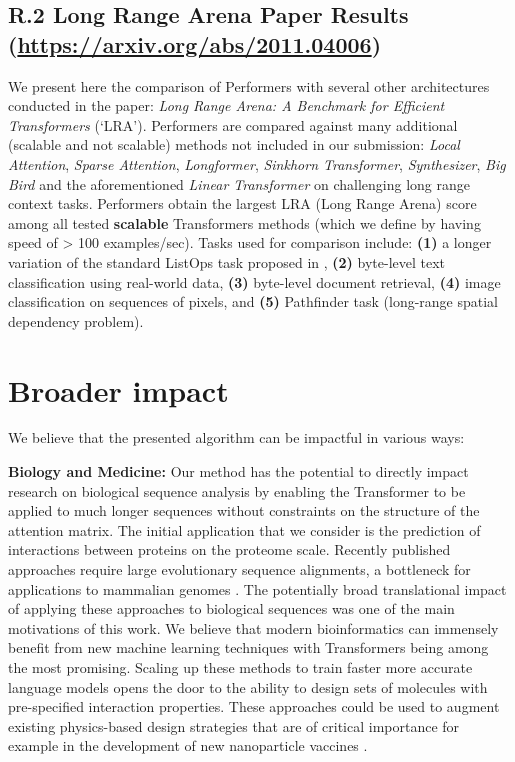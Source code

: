 \subsection*{R.2 Long Range Arena Paper Results (\textcolor{blue}{\url{https://arxiv.org/abs/2011.04006}})}

We present here the comparison of Performers with several other architectures conducted in the paper: \textit{Long Range Arena: A Benchmark for Efficient Transformers} (`LRA'). Performers are compared against many additional (scalable and not scalable) methods not included in our submission: \textit{Local Attention}, \textit{Sparse Attention}, \textit{Longformer}, \textit{Sinkhorn Transformer}, \textit{Synthesizer}, \textit{Big Bird} and the aforementioned \textit{Linear Transformer} on challenging long range context tasks. Performers obtain the largest LRA (Long Range Arena) score among all tested \textbf{scalable} Transformers methods (which we define by having speed of > 100 examples/sec). Tasks used for comparison include: \textbf{(1)} a longer variation of the standard ListOps task proposed in \citep{listops}, \textbf{(2)} byte-level text classification using real-world data, \textbf{(3)} byte-level document retrieval, \textbf{(4)} image classification on sequences of pixels, and \textbf{(5)} Pathfinder task (long-range spatial dependency problem).

\section{Broader impact}
\label{sec:broader_impact}
We believe that the presented algorithm can be impactful in various ways:

\textbf{Biology and Medicine:} Our method has the potential to directly impact research on biological sequence analysis by enabling the Transformer to be applied to much longer sequences without constraints on the structure of the attention matrix. The initial application that we consider is the prediction of interactions between proteins on the proteome scale. Recently published approaches require large evolutionary sequence alignments, a bottleneck for applications to mammalian genomes \citep{cong2019protein}. The potentially broad translational impact of applying these approaches to biological sequences was one of the main motivations of this work. We believe that modern bioinformatics can immensely benefit from new machine learning techniques with Transformers being among the most promising. Scaling up these methods to train faster more accurate language models opens the door to the ability to design sets of molecules with pre-specified interaction properties. These approaches could be used to augment existing physics-based design strategies that are of critical importance for example in the development of new nanoparticle vaccines \citep{marcandalli2019induction}.  

